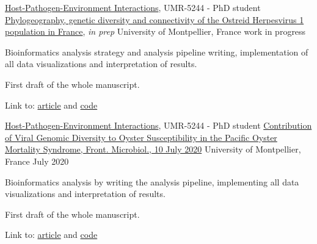 

\begin{cventries}

  \cventry
    {\href{http://ihpe.univ-perp.fr/}{Host-Pathogen-Environment Interactions}, UMR-5244 - PhD student} %
    {\href{}{Phylogeography, genetic diversity and connectivity of the Ostreid Herpesvirus 1 population in France}, \textit{in prep}} %
    {University of Montpellier, France} %
    {work in progress} %
    {
      \begin{cvitems} %
        \item {Bioinformatics analysis strategy and analysis pipeline writing, implementation of all data visualizations and interpretation of results.}
        \item {First draft of the whole manuscript.}
        \item Link to: {\href{DOI}{article} and \href{https://github.com/propan2one/OshV-1-molepidemio}{code}}
      \end{cvitems}
    }

  \cventry
    {\href{http://ihpe.univ-perp.fr/}{Host-Pathogen-Environment Interactions}, UMR-5244 - PhD student} %
    {\href{https://doi.org/10.3389/fmicb.2020.01579}{Contribution of Viral Genomic Diversity to Oyster Susceptibility in the Pacific Oyster Mortality Syndrome, Front. Microbiol., 10 July 2020}} %
    {University of Montpellier, France} %
    {July 2020} %
    {
      \begin{cvitems} %
        \item {Bioinformatics analysis by writing the analysis pipeline, implementing all data visualizations and interpretation of results.}
        \item {First draft of the whole manuscript.}
        \item Link to: {\href{https://doi.org/10.3389/fmicb.2020.01579}{article} and \href{https://github.com/propan2one/DivOsHV-1}{code}}
      \end{cvitems}
    }


\end{cventries}
